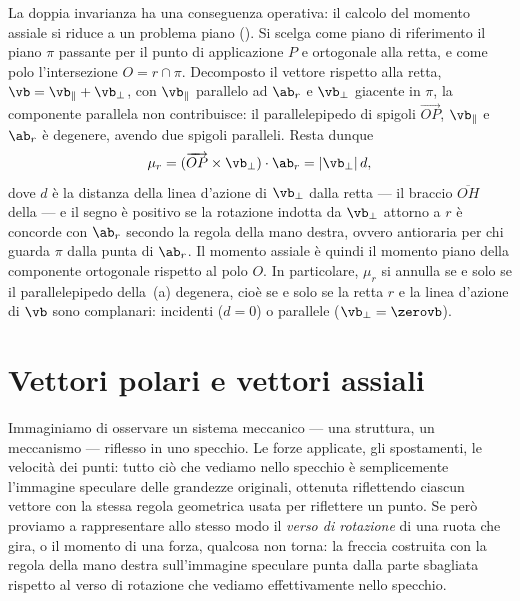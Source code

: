 La doppia invarianza ha una conseguenza operativa: il calcolo del
momento assiale si riduce a un problema piano
(). Si scelga come piano di
riferimento il piano $\pi$ passante per il punto di applicazione
$P$ e ortogonale alla retta, e come polo l'intersezione
$O = r \cap \pi$. Decomposto il vettore rispetto alla retta,
$\vb = \vb_\parallel + \vb_\perp$, con $\vb_\parallel$ parallelo ad
$\ab_r$ e $\vb_\perp$ giacente in $\pi$, la componente parallela
non contribuisce: il parallelepipedo di spigoli
$\overrightarrow{OP}$, $\vb_\parallel$ e $\ab_r$ è degenere, avendo
due spigoli paralleli. Resta dunque
\begin{equation}
	\mu_r = (\overrightarrow{OP} \times \vb_\perp) \cdot \ab_r
	= |\vb_\perp|\,d,
\end{equation}
dove $d$ è la distanza della linea d'azione di $\vb_\perp$ dalla
retta --- il braccio $\overline{OH}$ della
 --- e il segno è positivo se la
rotazione indotta da $\vb_\perp$ attorno a $r$ è concorde con
$\ab_r$ secondo la regola della mano destra, ovvero antioraria per
chi guarda $\pi$ dalla punta di $\ab_r$. Il momento assiale è
quindi il momento piano della componente ortogonale rispetto al
polo $O$. In particolare, $\mu_r$ si annulla se e solo se il
parallelepipedo della \,(a)
degenera, cioè se e solo se la retta $r$ e la linea d'azione di
$\vb$ sono complanari: incidenti ($d = 0$) o parallele
($\vb_\perp = \zerovb$).






\section{Vettori polari e vettori assiali}\label{sec:polari_assiali}
Immaginiamo di osservare un sistema meccanico --- una struttura, un
meccanismo --- riflesso in uno specchio. Le forze applicate, gli
spostamenti, le velocità dei punti: tutto ciò che vediamo nello specchio è
semplicemente l'immagine speculare delle grandezze originali, ottenuta
riflettendo ciascun vettore con la stessa regola geometrica usata per
riflettere un punto. Se però proviamo a rappresentare allo stesso modo il
\emph{verso di rotazione} di una ruota che gira, o il momento di una
forza, qualcosa non torna: la freccia costruita con la regola della mano
destra sull'immagine speculare punta dalla parte sbagliata rispetto al
verso di rotazione che vediamo effettivamente nello specchio.

